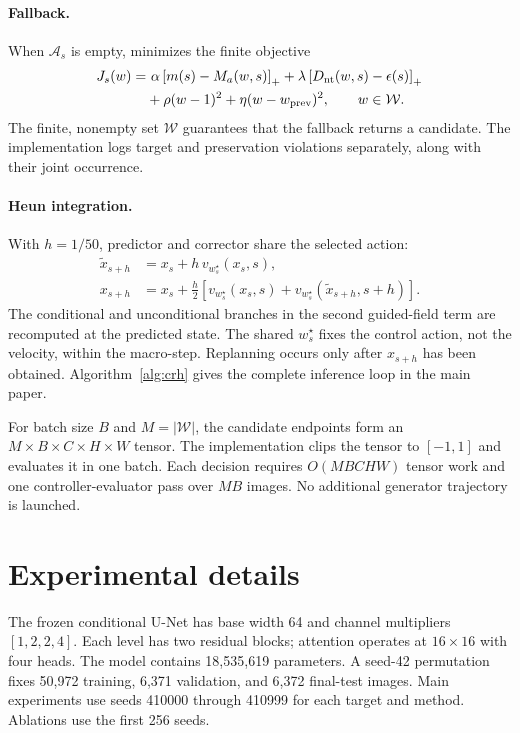 \documentclass[10pt,twocolumn,letterpaper]{article}
\begin{document}
\paragraph{Fallback.}
When $\mathcal{A}_s$ is empty, \method minimizes the finite objective
\begin{align}
J_s(w)=&\ \alpha\left[m(s)-M_a(w,s)\right]_{+}
+\lambda\left[D_{\mathrm{nt}}(w,s)-\epsilon(s)\right]_{+}\nonumber\\
&+\rho(w-1)^2+\eta(w-w_{\mathrm{prev}})^2,
\qquad w\in\mathcal{W}.
\label{eq:fallback}
\end{align}
The finite, nonempty set $\mathcal{W}$ guarantees that the fallback returns a
candidate. The implementation logs target and preservation violations
separately, along with their joint occurrence.

\paragraph{Heun integration.}
With $h=1/50$, predictor and corrector share the selected action:
\begin{align}
\tilde{x}_{s+h}&=x_s+h\,v_{w_s^\star}(x_s,s),\\
x_{s+h}&=x_s+\frac{h}{2}\left[v_{w_s^\star}(x_s,s)+
v_{w_s^\star}(\tilde{x}_{s+h},s+h)\right].
\label{eq:heun}
\end{align}
The conditional and unconditional branches in the second guided-field term are
recomputed at the predicted state. The shared $w_s^\star$ fixes the control
action, not the velocity, within the macro-step. Replanning occurs only after
$x_{s+h}$ has been obtained. Algorithm~\ref{alg:crh} gives the complete
inference loop in the main paper.

For batch size $B$ and $M=|\mathcal W|$, the candidate endpoints form an
$M\times B\times C\times H\times W$ tensor. The implementation clips the
tensor to $[-1,1]$ and evaluates it in one batch. Each decision requires
$O(MBCHW)$ tensor work and one controller-evaluator pass over $MB$ images. No
additional generator trajectory is launched.

\section{Experimental details}
\label{app:experimental-details}

The frozen conditional U-Net has base width 64 and channel multipliers
$[1,2,2,4]$. Each level has two residual blocks; attention operates at
$16\times16$ with four heads. The model contains 18,535,619 parameters. A
seed-42 permutation fixes 50,972 training, 6,371 validation, and 6,372
final-test images. Main experiments use seeds 410000 through 410999 for each
target and method. Ablations use the first 256 seeds.
\end{document}
